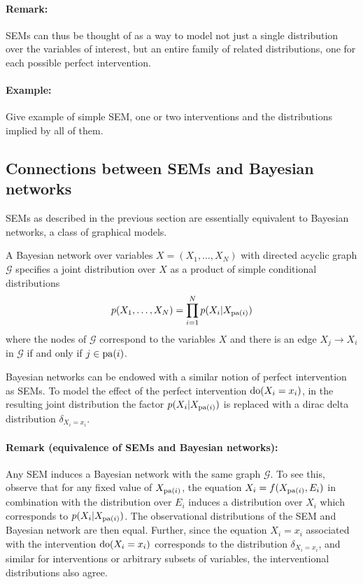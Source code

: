 \paragraph{Remark:} SEMs can thus be thought of as a way to model not just a single distribution over the variables of interest, but an entire family of related distributions, one for each possible perfect intervention.


\paragraph{Example:} Give example of simple SEM, one or two interventions and the distributions implied by all of them.

\subsection{Connections between SEMs and Bayesian networks}

SEMs as described in the previous section are essentially equivalent to Bayesian networks, a class of graphical models.
\begin{definition}
A Bayesian network over variables $X = (X_1,\ldots, X_N)$ with directed acyclic graph $\mathcal{G}$ specifies a joint distribution over $X$ as a product of simple conditional distributions
\begin{align*}
	p(X_1,\ldots,X_N) = \prod_{i=1}^N p(X_i | X_{\operatorname{pa}(i)})
\end{align*}
where the nodes of $\mathcal{G}$ correspond to the variables $X$ and there is an edge $X_j \to X_i$ in $\mathcal{G}$ if and only if $j \in \operatorname{pa}(i)$.

Bayesian networks can be endowed with a similar notion of perfect intervention as SEMs. To model the effect of the perfect intervention $\operatorname{do}(X_i = x_i)$, in the resulting joint distribution the factor $p(X_i | X_{\operatorname{pa}(i)})$ is replaced with a dirac delta distribution $\delta_{X_i = x_i}$.
\end{definition}

\paragraph{Remark (equivalence of SEMs and Bayesian networks):} Any SEM induces a Bayesian network with the same graph $\mathcal{G}$.
To see this, observe that for any fixed value of $X_{\operatorname{pa}(i)}$, the equation $X_i = f(X_{\operatorname{pa}(i)} , E_i)$ in combination with the distribution over $E_i$ induces a distribution over $X_i$ which corresponds to $p(X_i | X_{\operatorname{pa}(i)})$. The observational distributions of the SEM and Bayesian network are then equal. Further, since the equation $X_i=x_i$ associated with the intervention $\operatorname{do}(X_i = x_i)$ corresponds to the distribution $\delta_{X_i = x_i}$, and similar for interventions or arbitrary subsets of variables, the interventional distributions also agree.

